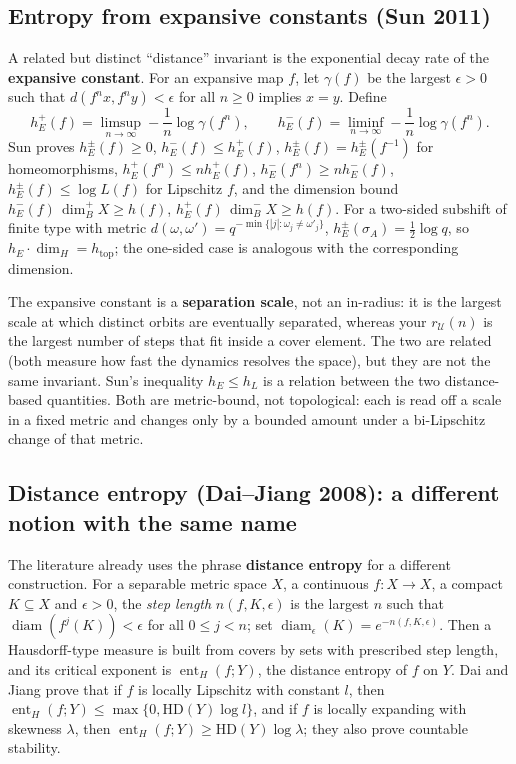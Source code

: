 \documentclass[
]{article}
\begin{document}
\subsection{Entropy from expansive constants (Sun
2011)}\label{entropy-from-expansive-constants-sun-2011}

A related but distinct ``distance'' invariant is the exponential decay
rate of the \textbf{expansive constant}. For an expansive map \(f\), let
\(\gamma(f)\) be the largest \(\epsilon>0\) such that
\(d(f^n x,f^n y)<\epsilon\) for all \(n\ge0\) implies \(x=y\). Define \[
h_E^+(f)=\limsup_{n\to\infty}-\frac1n\log\gamma(f^n),\qquad
h_E^-(f)=\liminf_{n\to\infty}-\frac1n\log\gamma(f^n).
\] Sun proves \(h_E^\pm(f)\ge0\), \(h_E^-(f)\le h_E^+(f)\),
\(h_E^\pm(f)=h_E^\pm(f^{-1})\) for homeomorphisms,
\(h_E^+(f^n)\le n h_E^+(f)\), \(h_E^-(f^n)\ge n h_E^-(f)\),
\(h_E^\pm(f)\le\log L(f)\) for Lipschitz \(f\), and the dimension bound
\(h_E^-(f)\,\dim_B^+X\ge h(f)\), \(h_E^+(f)\,\dim_B^-X\ge h(f)\). For a
two-sided subshift of finite type with metric
\(d(\omega,\omega')=q^{-\min\{|j|:\omega_j\ne\omega'_j\}}\),
\(h_E^\pm(\sigma_A)=\frac12\log q\), so
\(h_E\cdot\dim_H=h_{\mathrm{top}}\); the one-sided case is analogous
with the corresponding dimension.

The expansive constant is a \textbf{separation scale}, not an in-radius:
it is the largest scale at which distinct orbits are eventually
separated, whereas your \(r_{\mathcal U}(n)\) is the largest number of
steps that fit inside a cover element. The two are related (both measure
how fast the dynamics resolves the space), but they are not the same
invariant. Sun's inequality \(h_E\le h_L\) is a relation between the two
distance-based quantities. Both are metric-bound, not topological: each
is read off a scale in a fixed metric and changes only by a bounded
amount under a bi-Lipschitz change of that metric.

\subsection{Distance entropy (Dai--Jiang 2008): a different notion with
the same
name}\label{distance-entropy-daijiang-2008-a-different-notion-with-the-same-name}

The literature already uses the phrase \textbf{distance entropy} for a
different construction. For a separable metric space \(X\), a continuous
\(f:X\to X\), a compact \(K\subseteq X\) and \(\epsilon>0\), the
\emph{step length} \(n(f,K,\epsilon)\) is the largest \(n\) such that
\(\operatorname{diam}(f^j(K))<\epsilon\) for all \(0\le j<n\); set
\(\operatorname{diam}_\epsilon(K)=e^{-n(f,K,\epsilon)}\). Then a
Hausdorff-type measure is built from covers by sets with prescribed step
length, and its critical exponent is \(\operatorname{ent}_H(f;Y)\), the
distance entropy of \(f\) on \(Y\). Dai and Jiang prove that if \(f\) is
locally Lipschitz with constant \(l\), then
\(\operatorname{ent}_H(f;Y)\le\max\{0,\mathrm{HD}(Y)\log l\}\), and if
\(f\) is locally expanding with skewness \(\lambda\), then
\(\operatorname{ent}_H(f;Y)\ge\mathrm{HD}(Y)\log\lambda\); they also
prove countable stability.
\end{document}
